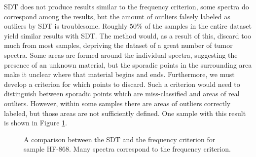 SDT does not produce results similar to the frequency criterion, some spectra do correspond among the results, but the amount of outliers falsely labeled as outliers by SDT is troublesome. Roughly $50\%$ of the samples in the entire dataset yield similar results with SDT. The method would, as a result of this, discard too much from most samples, depriving the dataset of a great number of tumor spectra. Some areas are formed around the individual spectra, suggesting the presence of an unknown material, but the sporadic points in the surrounding area make it unclear where that material begins and ends. Furthermore, we must develop a criterion for which points to discard. Such a criterion would need to distinguish between sporadic points which are miss-classified and areas of real outliers. However, within some samples there are areas of outliers correctly labeled, but those areas are not sufficiently defined. One sample with this result is shown in Figure \ref{fig:stdHF868}.

\begin{figure}[H]
    \centering
    \qquad
    \caption{A comparison between the SDT and the frequency criterion for sample HF-868. Many spectra correspond to the frequency criterion.
\label{fig:stdHF868}}%
\end{figure}

